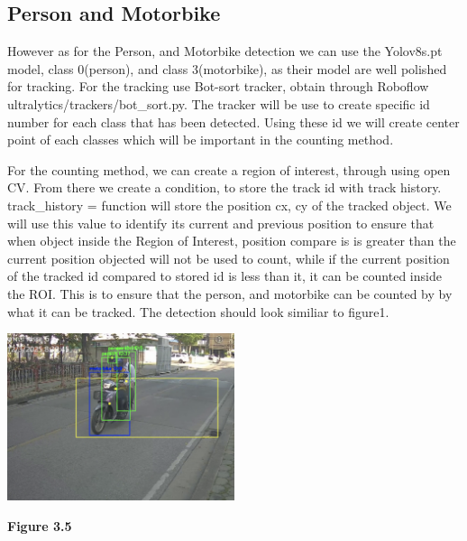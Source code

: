 	
	
	
\subsection{Person and Motorbike}
\noindent\hspace{2.5em}However as for the Person, and Motorbike detection we can use the Yolov8s.pt model, class 0(person), and class 3(motorbike), as their model are well polished for tracking. For the tracking use Bot-sort tracker, obtain through Roboflow ultralytics/trackers/bot\_sort.py. The tracker will be use to create specific id number for each class that has been detected. Using these id we will create center point of each classes which will be important in the counting method.


\noindent\hspace{2.5em}For the counting method, we can create a region of interest, through using open CV. From there we create a condition, to store the track id with track history. track\_history = {}   function will store the position cx, cy of the tracked object. We will use this value to identify its current and previous position to ensure that when object inside the Region of Interest, position compare is is greater than the current position objected will not be used to count, while if the current position of the tracked id compared to stored id is less than it, it can be counted inside the ROI. This is to ensure that the person, and motorbike can be counted by by what it can be tracked. The detection should look similiar to figure1.

\begin{center}
	\includegraphics[width=0.5\textwidth]{fig1.png}
	
	\vspace{0.5em}
	\textbf{Figure 3.5}
\end{center}


